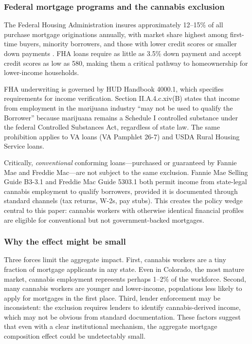 \documentclass[12pt]{article}
\begin{document}
\subsubsection*{Federal mortgage programs and the cannabis exclusion} The Federal Housing Administration insures approximately 12--15\% of all purchase mortgage originations annually, with market share highest among first-time buyers, minority borrowers, and those with lower credit scores or smaller down payments \citep{goodman2018}. FHA loans require as little as 3.5\% down payment and accept credit scores as low as 580, making them a critical pathway to homeownership for lower-income households.

FHA underwriting is governed by HUD Handbook 4000.1, which specifies requirements for income verification. Section II.A.4.c.xiv(B) states that income from employment in the marijuana industry ``may not be used to qualify the Borrower'' because marijuana remains a Schedule I controlled substance under the federal Controlled Substances Act, regardless of state law. The same prohibition applies to VA loans (VA Pamphlet 26-7) and USDA Rural Housing Service loans.

Critically, \textit{conventional} conforming loans---purchased or guaranteed by Fannie Mae and Freddie Mac---are not subject to the same exclusion. Fannie Mae Selling Guide B3-3.1 and Freddie Mac Guide 5303.1 both permit income from state-legal cannabis employment to qualify borrowers, provided it is documented through standard channels (tax returns, W-2s, pay stubs). This creates the policy wedge central to this paper: cannabis workers with otherwise identical financial profiles are eligible for conventional but not government-backed mortgages.

\subsubsection*{Why the effect might be small} Three forces limit the aggregate impact. First, cannabis workers are a tiny fraction of mortgage applicants in any state. Even in Colorado, the most mature market, cannabis employment represents perhaps 1--2\% of the workforce. Second, many cannabis workers are younger and lower-income, populations less likely to apply for mortgages in the first place. Third, lender enforcement may be inconsistent: the exclusion requires lenders to identify cannabis-derived income, which may not be obvious from standard documentation. These factors suggest that even with a clear institutional mechanism, the aggregate mortgage composition effect could be undetectably small.
\end{document}
